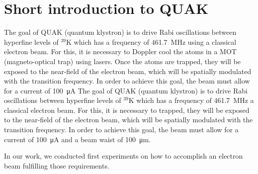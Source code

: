 
\chapter{Short introduction to QUAK}
\label{ch:Short introduction to QuaK}

The goal of QUAK (quantum klystron) is to drive Rabi oscillations between hyperfine levels of $^{39}\mathrm{K}$ which has a frequency of \SI{461.7}{\mega\hertz} \cite{tiecke:potassium-properties} using a classical electron beam. For this, it is necessary to Doppler cool the atoms in a MOT (magneto-optical trap) using lasers. Once the atoms are trapped, they will be exposed to the near-field of the electron beam, which will be spatially modulated with the transition frequency. In order to achieve this goal, the beam must allow for a current of \SI{100}{\micro\ampere}
The goal of QUAK (quantum klystron) is to drive Rabi oscillations between hyperfine levels of $^{39}\mathrm{K}$  which has a frequency of \SI{461.7}{\mega\hertz} \cite{tiecke:potassium-properties}  a classical electron beam. For this, it is necessary to  trapped, they will be exposed to the near-field of the electron beam, which will be spatially modulated with the transition frequency. In order to achieve this goal, the beam must allow for a current of \SI{100}{\micro\ampere}
and a beam waist of \SI{100}{\micro\meter}.

In our work, we conducted first experiments on how to accomplish an electron beam fulfilling those requirements.